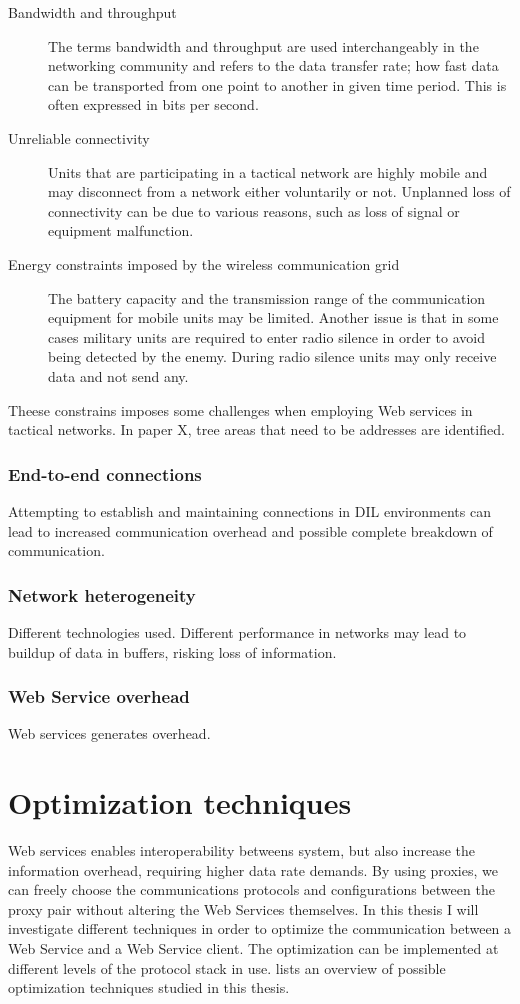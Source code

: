 \documentclass[USenglish]{ifimaster}
\begin{document}
\begin{description}
\item[Bandwidth and throughput] The terms bandwidth and throughput are used interchangeably in the networking community and refers to the data transfer rate; how fast data can be transported from one point to another in given time period. This is often expressed in bits per second.
\item[Unreliable connectivity] Units that are participating in a tactical network are highly mobile and may disconnect from a network either voluntarily or not. Unplanned loss of connectivity can be due to various reasons, such as loss of signal or equipment malfunction.
\item[Energy constraints imposed by the wireless communication grid] The battery capacity and the transmission range of the communication equipment for mobile units may be limited. Another issue is that in some cases military units are required to enter radio silence in order to avoid being detected by the enemy. During radio silence units may only receive data and not send any.
\end{description}

Theese constrains imposes some challenges when employing Web services in tactical networks. In paper X, tree areas that need to be addresses are identified\cite{IST-118}.

\label{section:DIL-problems}
\subsubsection{End-to-end connections}
Attempting to establish and maintaining connections in DIL environments can lead to increased communication overhead and possible complete breakdown of communication.
\subsubsection{Network heterogeneity}
Different technologies used. Different performance in networks may lead to buildup of data in buffers, risking loss of information.
\subsubsection{Web Service overhead}
Web services generates overhead.
\section{Optimization techniques}
Web services enables interoperability betweens system, but also increase the information overhead, requiring higher data rate demands. By using proxies, we can freely choose the communications protocols and configurations between the proxy pair without altering the Web Services themselves. In this thesis I will investigate different techniques in order to optimize the communication between a Web Service and a Web Service client. The optimization can be implemented at different levels of the protocol stack in use.  lists an overview of possible optimization techniques studied in this thesis.
\\ \\
\end{document}
